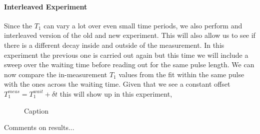 \paragraph{Interleaved Experiment } Since the $T_1$ can vary a lot over even small time periods, we also perform and interleaved version of the old and new experiment. This will also allow us to see if there is a different decay inside and outside of the measurement. In this experiment the previous one is carried out again but this time we will include a sweep over the waiting time before reading out for the same pulse length. We can now compare the in-measurement $T_1$ values from the fit within the same pulse with the ones across the waiting time. Given that we see a constant offset $T_1^{meas} = T_1^{wait} + \delta t$ this will show up in this experiment,

\begin{figure}
    \centering
    \caption{Caption}
    \label{fig:enter-label}
\end{figure}

Comments on results... 





